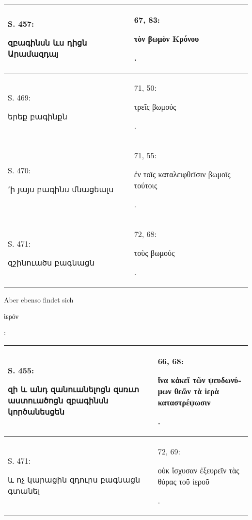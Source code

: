 \documentclass{article}
\begin{document}
{\begin{table}[H]
\begin{tabular}{p{45mm}|p{45mm}}
        S. 457: \begin{armenian}զբագինսն ևս դիցն Արամազդայ\end{armenian} & 67, 83: \begin{greek}τὸν βωμὸν Κρόνου\end{greek}.   \\ \hline
        S. 469: \begin{armenian}երեք բագինքն\end{armenian} & 71, 50: \begin{greek}τρεῖς βωμούς\end{greek}.   \\ \hline
        S. 470: \begin{armenian}՚ի յայս բագինս մնացեալս\end{armenian} & 71, 55: \begin{greek}ἐν τοῖς καταλειφθεῖσιν βωμοῖς τούτοις\end{greek}.   \\ \hline
        S. 471: \begin{armenian}զշինուածս բագնացն\end{armenian} & 72, 68: \begin{greek}τοὺς βωμούς\end{greek}. \\ \hline
    \end{tabular}
\end{table}
\hspace*{5mm}Aber ebenso findet sich \begin{greek}ἱερόν\end{greek}:  
\begin{table}[H]
    \centering
    \tiny
    \begin{tabular}{p{45mm}|p{45mm}}
    \hline
        S. 455: \begin{armenian}զի և անդ զանուանելոցն զսռւտ աստուածոցն զբագինսն կործանեսցեն\end{armenian} & 66, 68: \begin{greek}ἵνα κἀκεῖ τῶν ψευδωνύμων θεῶν τὰ ἱερὰ καταστρέψωσιν\end{greek}.   \\ \hline
        S. 471: \begin{armenian}և ոչ կարացին զդուրս բագնացն գտանել\end{armenian} & 72, 69: \begin{greek}οὐκ ἴσχυσαν ἐξευρεῖν τὰς θύρας τοῦ ἱεροῦ\end{greek}. \\ \hline
    \end{tabular}

\end{table}}
\end{document}
